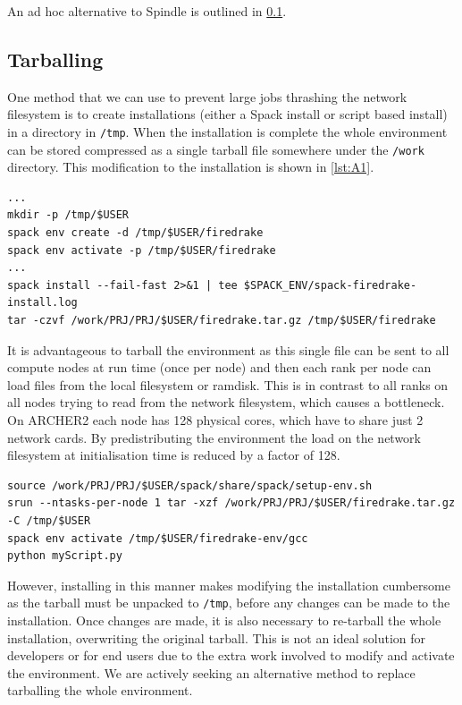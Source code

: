\documentclass[a4paper,11pt]{article}
\begin{document}
An ad hoc alternative to Spindle is outlined in \cref{ssec:tarball}.


\subsection{Tarballing}
\label{ssec:tarball}
One method that we can use to prevent large jobs thrashing the network filesystem is to create installations (either a Spack install or script based install) in a directory in \verb`/tmp`.
When the installation is complete the whole environment can be stored compressed as a single tarball file somewhere under the \verb`/work` directory.
This modification to the installation is shown in \cref{lst:A1}.

\begin{lstlisting}[float,caption={Modified steps in Spack installation, showing installation under \texttt{/tmp} and tarballing the installation at the end (other steps elided)},label={lst:A1}]
...
mkdir -p /tmp/$USER
spack env create -d /tmp/$USER/firedrake
spack env activate -p /tmp/$USER/firedrake
...
spack install --fail-fast 2>&1 | tee $SPACK_ENV/spack-firedrake-install.log
tar -czvf /work/PRJ/PRJ/$USER/firedrake.tar.gz /tmp/$USER/firedrake
\end{lstlisting}

It is advantageous to tarball the environment as this single file can be sent to all compute nodes at run time (once per node) and then each rank per node can load files from the local filesystem or ramdisk.
This is in contrast to all ranks on all nodes trying to read from the network filesystem, which causes a bottleneck.
On ARCHER2 each node has 128 physical cores, which have to share just 2 network cards.
By predistributing the environment the load on the network filesystem at initialisation time is reduced by a factor of 128.

\begin{lstlisting}[float,caption={Modified steps in running script under Spack, untarballing the installation before activating the environment},label={lst:A2}]
source /work/PRJ/PRJ/$USER/spack/share/spack/setup-env.sh
srun --ntasks-per-node 1 tar -xzf /work/PRJ/PRJ/$USER/firedrake.tar.gz -C /tmp/$USER
spack env activate /tmp/$USER/firedrake-env/gcc
python myScript.py
\end{lstlisting}

However, installing in this manner makes modifying the installation cumbersome as the tarball must be unpacked to \verb`/tmp`, before any changes can be made to the installation.
Once changes are made, it is also necessary to re-tarball the whole installation, overwriting the original tarball.
This is not an ideal solution for developers or for end users due to the extra work involved to modify and activate the environment.
We are actively seeking an alternative method to replace tarballing the whole environment.




\end{document}
